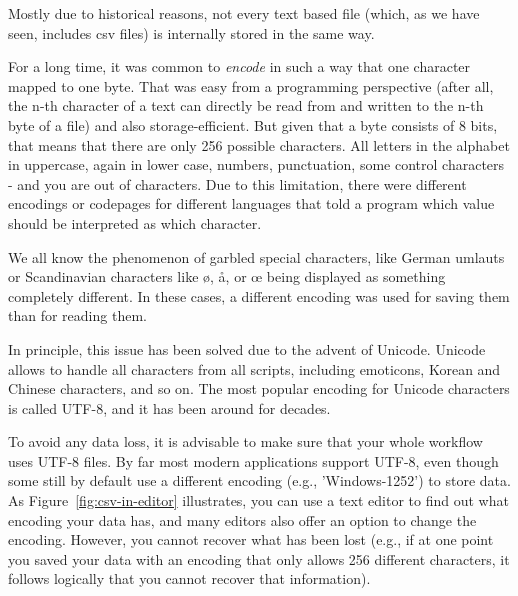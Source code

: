 Mostly due to historical reasons, not every text based file (which, as we have seen, includes csv files) is internally stored in the same way.

For a long time, it was common to \emph{encode} in such a way that one character mapped to one byte. That was easy from a programming perspective (after all, the n-th character of a text can directly be read from and written to the n-th byte of a file) and also storage-efficient. But given that a byte consists of 8 bits, that means that there are only 256 possible characters. All letters in the alphabet in uppercase, again in lower case, numbers, punctuation, some control characters - and you are out of characters. Due to this limitation, there were different encodings or codepages for different languages that told a program which value should be interpreted as which character.

We all know the phenomenon of garbled special characters, like German umlauts or Scandinavian characters like ø, å, or œ being displayed as something completely different. In these cases, a different encoding was used for saving them than for reading them.

In principle, this issue has been solved due to the advent of Unicode. Unicode allows to handle all characters from all scripts, including emoticons, Korean and Chinese characters, and so on. The most popular encoding for Unicode characters is called UTF-8, and it has been around for decades. 

To avoid any data loss, it is advisable to make sure that your whole workflow uses UTF-8 files. By far most modern applications support UTF-8, even though some still by default use a different encoding (e.g., 'Windows-1252') to store data. As Figure~\ref{fig:csv-in-editor} illustrates, you can use a text editor to find out what encoding your data has, and many editors also offer an option to change the encoding. However, you cannot recover what has been lost (e.g., if at one point you saved your data with an encoding that only allows 256 different characters, it follows logically that you cannot recover that information).


